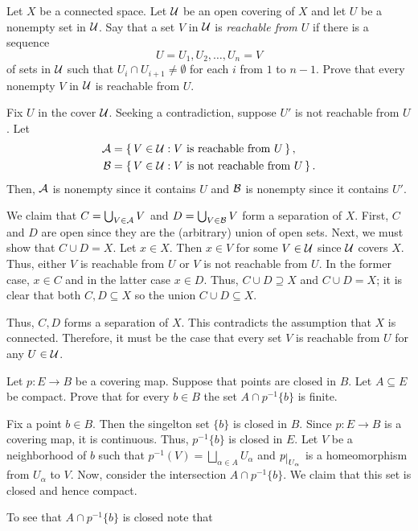 \begin{problem}
  Let \(X\) be a connected space. Let \(\mathcal{U}\) be an open covering of
  \(X\) and let \(U\) be a nonempty set in \(\mathcal{U}\). Say that a set \(V\)
  in \(\mathcal{U}\) is \emph{reachable from \(U\)} if there is a sequence
  \[
    U=U_1,U_2,\dotsc,U_n=V
  \]
  of sets in \(\mathcal{U}\) such that \(U_i\cap U_{i+1}\neq\emptyset\) for each
  \(i\) from \(1\) to \(n-1\). Prove that every nonempty \(V\) in \(\mathcal{U}\)
  is reachable from \(U\).
\end{problem}
\begin{solution}
  Fix \(U\) in the cover \(\mathcal{U}\). Seeking a contradiction, suppose \(U'\)
  is not reachable from \(U\). Let
  \begin{align*}
    \mathcal{A}&=\left\{\,V\in\mathcal{U}:\text{\(V\) is reachable from
           \(U\)}\,\right\},\\
    \mathcal{B}&=\left\{\,V\in\mathcal{U}:\text{\(V\) is not reachable from
    \(U\)}\,\right\}.
  \end{align*}
  Then, \(\mathcal{A}\) is nonempty since it contains \(U\) and \(\mathcal{B}\) is
  nonempty since it contains \(U'\).

  We claim that \(C=\bigcup_{V\in\mathcal{A}}V\) and \(D=\bigcup_{V\in\mathcal{B}}V\)
  form a separation of \(X\). First, \(C\) and \(D\) are open since they
  are the (arbitrary) union of open sets. Next, we must show that
  \(C\cup D=X\). Let \(x\in X\). Then \(x\in V\) for some \(V\in\mathcal{U}\)
  since \(\mathcal{U}\) covers \(X\). Thus, either \(V\) is reachable from \(U\)
  or \(V\) is not reachable from \(U\). In the former case, \(x\in C\) and
  in the latter case \(x\in D\). Thus, \(C\cup D\supseteq X\) and
  \(C\cup D=X\); it is clear that both \(C,D\subseteq X\) so the union
  \(C\cup D\subseteq X\).

  Thus, \(C,D\) forms a separation of \(X\). This contradicts the
  assumption that \(X\) is connected. Therefore, it must be the case that
  every set \(V\) is reachable from \(U\) for any \(U\in\mathcal{U}\).
\end{solution}

\begin{problem}
  Let \(p\colon E\to B\) be a covering map. Suppose that points are closed
  in \(B\). Let \(A\subseteq E\) be compact. Prove that for every
  \(b\in B\) the set \(A\cap p^{-1}\{b\}\) is finite.
\end{problem}
\begin{solution}
  Fix a point \(b\in B\). Then the singelton set \(\{b\}\) is closed in
  \(B\). Since \(p\colon E\to B\) is a covering map, it is
  continuous. Thus, \(p^{-1}\{b\}\) is closed in \(E\). Let \(V\) be a
  neighborhood of \(b\) such that \(p^{-1}(V)=\bigsqcup_{\alpha\in
    A}U_\alpha\) and \(p\restrict{U_\alpha}\) is a homeomorphism from
  \(U_\alpha\) to \(V\). Now, consider the intersection \(A\cap
  p^{-1}\{b\}\). We claim that this set is closed and hence compact.

  To see that \(A\cap p^{-1}\{b\}\) is closed note that \(\)
\end{solution}

